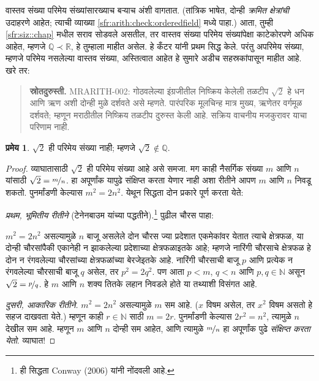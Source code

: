 \documentclass[11pt,a4paper,openany]{book}
\theoremstyle{definition}
\newtheorem{thm}[defn]{प्रमेय}
\newcommand{\Nat}{\mathbb{N}}
\newcommand{\Rat}{\mathbb{Q}}
\newcommand{\Real}{\mathbb{R}}
\newcommand{\cardless}[2]{#1 \prec #2}
\begin{document}
वास्तव संख्या परिमेय संख्यांसारख्याच बऱ्याच अंशी वागतात. (तांत्रिक
भाषेत, दोन्ही \emph{क्रमित क्षेत्रांची} उदाहरणे आहेत; त्याची व्याख्या
\ref{sfr:arith:check:orderedfield} मध्ये पाहा.) आता, तुम्ही \ref{sfr:siz::chap}
मधील सराव सोडवले असतील, तर वास्तव संख्या परिमेय संख्यांपेक्षा काटेकोरपणे
अधिक आहेत, म्हणजे $\cardless{\Rat}{\Real}$, हे तुम्हाला माहीत असेल.
हे कँटर यांनी प्रथम सिद्ध केले. परंतु अपरिमेय संख्या, म्हणजे परिमेय
नसलेल्या वास्तव संख्या, अस्तित्वात आहेत हे सुमारे अडीच सहस्रकांपासून
माहीत आहे. खरे तर:
\begin{quote}\small\textbf{स्रोतदुरुस्ती.} MRARITH-002: गोठवलेल्या इंग्रजीतील निष्क्रिय केलेली तळटीप $\sqrt{2}$ हे धन आणि ऋण अशी दोन्ही मुळे दर्शवते असे म्हणते. पारंपरिक मूलचिन्ह मात्र मुख्य, ऋणेतर वर्गमूळ दर्शवते; म्हणून मराठीतील निष्क्रिय तळटीप दुरुस्त केली आहे. सक्रिय वाचनीय मजकुरावर याचा परिणाम नाही.\end{quote}
\begin{thm}\label{sfr:arith:real:root2irrational}
$\sqrt{2}$ ही परिमेय संख्या नाही; म्हणजे $\sqrt{2} \notin \Rat$.
\end{thm}

\begin{proof}
व्याघातासाठी $\sqrt{2}$ ही परिमेय संख्या आहे असे समजा. मग काही नैसर्गिक
संख्या $m$ आणि $n$ यांसाठी $\sqrt{2} = \nicefrac{m}{n}$. हा अपूर्णांक
यापुढे संक्षिप्त करता येणार नाही अशा रीतीने आपण $m$ आणि $n$ निवडू शकतो.
पुनर्मांडणी केल्यास $m^{2} = 2n^{2}$. येथून सिद्धता दोन प्रकारे पूर्ण
करता येते:

\emph{प्रथम, भूमितीय रीतीने} (टेनेनबाउम यांच्या पद्धतीने).\footnote{ही
सिद्धता Conway (2006) यांनी नोंदवली आहे.} पुढील चौरस पाहा:
\begin{center}
\end{center}
$m^2 = 2n^2$ असल्यामुळे $n$ बाजू असलेले दोन चौरस ज्या प्रदेशात
एकमेकांवर येतात त्याचे क्षेत्रफळ, या दोन्ही चौरसांपैकी एकानेही न झाकलेल्या
प्रदेशाच्या क्षेत्रफळाइतके आहे; म्हणजे नारिंगी चौरसाचे क्षेत्रफळ हे दोन
न रंगवलेल्या चौरसांच्या क्षेत्रफळांच्या बेरजेइतके आहे. नारिंगी चौरसाची
बाजू $p$ आणि प्रत्येक न रंगवलेल्या चौरसाची बाजू $q$ असेल, तर $p^2 =
2q^2$. पण आता $p < m$, $q < n$ आणि $p, q \in \Nat$ असून
$\sqrt{2} = \nicefrac{p}{q}$. हे $m$ आणि $n$ शक्य तितके लहान निवडले
होते या तथ्याशी विसंगत आहे.

\emph{दुसरी, आकारिक रीतीने.} $m^{2} = 2n^{2}$ असल्यामुळे $m$ सम आहे.
($x$ विषम असेल, तर $x^2$ विषम असतो हे सहज दाखवता येते.) म्हणून काही
$r \in \Nat$ साठी $m = 2r$. पुनर्मांडणी केल्यास $2r^2 = n^2$,
त्यामुळे $n$ देखील सम आहे. म्हणून $m$ आणि $n$ दोन्ही सम आहेत, आणि
त्यामुळे $\nicefrac{m}{n}$ हा अपूर्णांक पुढे \emph{संक्षिप्त करता येतो}.
व्याघात!
\end{proof}
\end{document}
